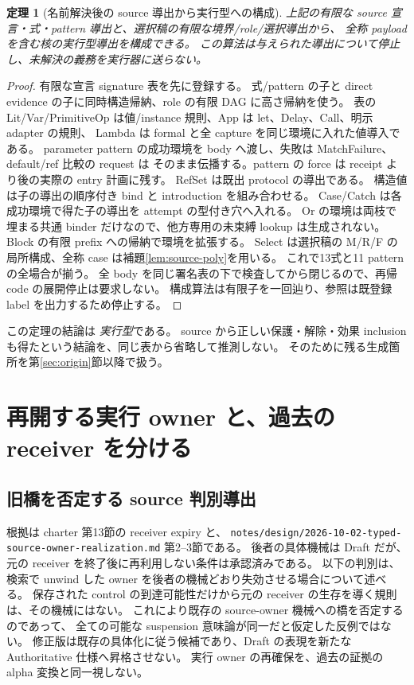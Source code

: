 \documentclass[11pt,a4paper]{article}
\newtheorem{theorem}[definition]{定理}
\begin{document}
\begin{theorem}[名前解決後の source 導出から実行型への構成]
\label{thm:source-value}
上記の有限な source 宣言・式・pattern 導出と、選択稿の有限な境界/role/選択導出から、
全称 payload を含む核の実行型導出を構成できる。
この算法は与えられた導出について停止し、未解決の義務を実行器に送らない。
\end{theorem}
\begin{proof}
有限な宣言 signature 表を先に登録する。
式/pattern の子と direct evidence の子に同時構造帰納、role の有限 DAG に高さ帰納を使う。
表の Lit/Var/PrimitiveOp は値/instance 規則、App は let、Delay、Call、明示 adapter の規則、
Lambda は formal と全 capture を同じ環境に入れた値導入である。
parameter pattern の成功環境を body へ渡し、失敗は MatchFailure、default/ref 比較の request は
そのまま伝播する。pattern の force は receipt より後の実際の entry 計画に残す。
RefSet は既出 protocol の導出である。
構造値は子の導出の順序付き bind と introduction を組み合わせる。
Case/Catch は各成功環境で得た子の導出を attempt の型付き穴へ入れる。
Or の環境は両枝で埋まる共通 binder だけなので、他方専用の未束縛 lookup は生成されない。
Block の有限 prefix への帰納で環境を拡張する。
Select は選択稿の M/R/F の局所構成、全称 case は補題\ref{lem:source-poly}を用いる。
これで13式と11 pattern の全場合が揃う。
全 body を同じ署名表の下で検査してから閉じるので、再帰 code の展開停止は要求しない。
構成算法は有限子を一回辿り、参照は既登録 label を出力するため停止する。
\end{proof}

この定理の結論は \emph{実行型}である。
source から正しい保護・解除・効果 inclusion も得たという結論を、同じ表から省略して推測しない。
そのために残る生成箇所を第\ref{sec:origin}節以降で扱う。

\section{再開する実行 owner と、過去の receiver を分ける}
\label{sec:owners}

\subsection{旧橋を否定する source 判別導出}

根拠は charter 第13節の receiver expiry と、
\nolinkurl{notes/design/2026-10-02-typed-source-owner-realization.md} 第2--3節である。
後者の具体機械は Draft だが、元の receiver を終了後に再利用しない条件は承認済みである。
以下の判別は、検索で unwind した owner を後者の機械どおり失効させる場合について述べる。
保存された control の到達可能性だけから元の receiver の生存を導く規則は、その機械にはない。
これにより既存の source-owner 機械への橋を否定するのであって、
全ての可能な suspension 意味論が同一だと仮定した反例ではない。
修正版は既存の具体化に従う候補であり、Draft の表現を新たな Authoritative 仕様へ昇格させない。
実行 owner の再確保を、過去の証拠の alpha 変換と同一視しない。
\end{document}
